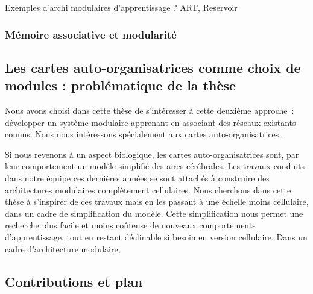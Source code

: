 Exemples d'archi modulaires d'apprentissage ? ART, Reservoir

\subsubsection*{Mémoire associative et modularité}


\subsection*{ Les cartes auto-organisatrices comme choix de modules : problématique de la thèse }

Nous avons choisi dans cette thèse de s'intéresser à cette deuxième approche~: développer un système modulaire apprenant en associant des réseaux existants connus. Nous nous intéressons spécialement aux cartes auto-organisatrices.

Si nous revenons à un aspect biologique, les cartes auto-organisatrices sont, par leur comportement un modèle simplifié des aires cérébrales. Les travaux conduits dans notre équipe ces dernières années se sont attachés à construire des architectures modulaires complètement cellulaires. Nous cherchons dans cette thèse à s'inspirer de ces travaux mais en les passant à une échelle moins cellulaire, dans un cadre de simplification du modèle. Cette simplification nous permet une recherche plus facile et moins coûteuse de nouveaux comportements d'apprentissage, tout en restant déclinable si besoin en version cellulaire.
Dans un cadre d'architecture modulaire, 






\subsection*{Contributions et plan}

